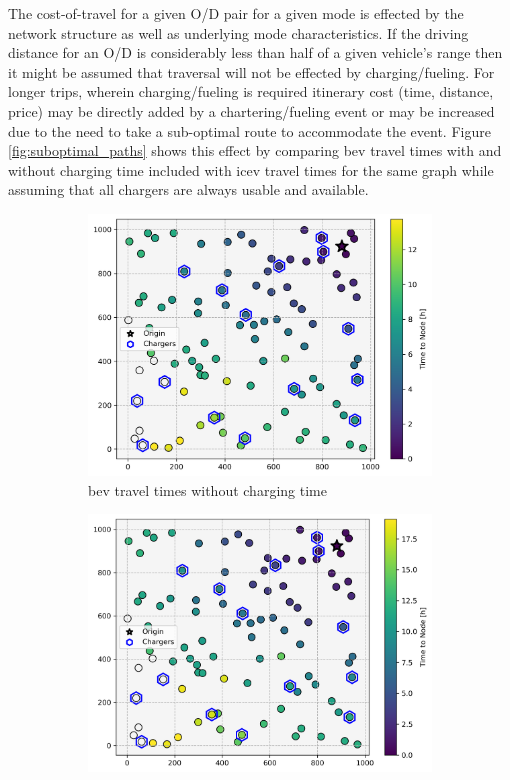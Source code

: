 The cost-of-travel for a given O/D pair for a given mode is effected by the network structure as well as underlying mode characteristics. If the driving distance for an O/D is considerably less than half of a given vehicle's range then it might be assumed that traversal will not be effected by charging/fueling. For longer trips, wherein charging/fueling is required itinerary cost (time, distance, price) may be directly added by a chartering/fueling event or may be increased due to the need to take a sub-optimal route to accommodate the event. Figure \ref{fig:suboptimal_paths} shows this effect by comparing \gls{bev} travel times with and without charging time included with \gls{icev} travel times for the same graph while assuming that all chargers are always usable and available.

\begin{figure}[H]
	\centering
	\begin{subfigure}[t]{.5\linewidth}
		\centering\includegraphics[width = \linewidth]{figs/effect_of_charging_bev_nc.png}
		\captionsetup{width=.8\linewidth}
		\caption{\gls{bev} travel times without charging time}
	\end{subfigure}%
	\begin{subfigure}[t]{.5\linewidth}
		\centering\includegraphics[width = \linewidth]{figs/effect_of_charging_bev_c.png}

\end{subfigure}
\end{figure}
